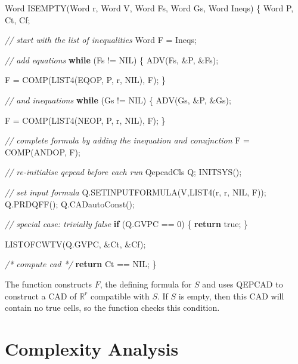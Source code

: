 \documentclass[
]{book}
\newenvironment{Shaded}{\begin{snugshade}}{\end{snugshade}}
\newcommand{\CommentTok}[1]{\textcolor[rgb]{0.56,0.35,0.01}{\textit{#1}}}
\newcommand{\ControlFlowTok}[1]{\textcolor[rgb]{0.13,0.29,0.53}{\textbf{#1}}}
\newcommand{\DecValTok}[1]{\textcolor[rgb]{0.00,0.00,0.81}{#1}}
\newcommand{\NormalTok}[1]{#1}
\theoremstyle{definition}
\theoremstyle{definition}
\theoremstyle{definition}
\theoremstyle{definition}
\theoremstyle{remark}
\begin{document}
\begin{Shaded}
\begin{Highlighting}[numbers=left,,]
\NormalTok{Word ISEMPTY(Word r, Word V, Word Fs, Word Gs, Word Ineqs)}
\NormalTok{\{}
\NormalTok{    Word P, Ct, Cf;}

    \CommentTok{// start with the list of inequalities}
\NormalTok{    Word F = Ineqs;}

    \CommentTok{// add equations}
    \ControlFlowTok{while}\NormalTok{ (Fs != NIL) \{}
\NormalTok{        ADV(Fs, \&P, \&Fs);}

\NormalTok{        F = COMP(LIST4(EQOP, P, r, NIL), F);}
\NormalTok{    \}}

    \CommentTok{// and inequations}
    \ControlFlowTok{while}\NormalTok{ (Gs != NIL) \{}
\NormalTok{        ADV(Gs, \&P, \&Gs);}

\NormalTok{        F = COMP(LIST4(NEOP, P, r, NIL), F);}
\NormalTok{    \}}

    \CommentTok{// complete formula by adding the inequation and conujnction}
\NormalTok{    F = COMP(ANDOP, F);}

    \CommentTok{// re{-}initialise qepcad before each run}
\NormalTok{    QepcadCls Q;}
\NormalTok{    INITSYS();}

    \CommentTok{// set input formula}
\NormalTok{    Q.SETINPUTFORMULA(V,LIST4(r, r, NIL, F));}
\NormalTok{    Q.PRDQFF();}
\NormalTok{    Q.CADautoConst();}

    \CommentTok{// special case: trivially false}
    \ControlFlowTok{if}\NormalTok{ (Q.GVPC == }\DecValTok{0}\NormalTok{) \{}
        \ControlFlowTok{return}\NormalTok{ true;}
\NormalTok{    \}}

\NormalTok{    LISTOFCWTV(Q.GVPC, \&Ct, \&Cf);}

    \CommentTok{/* compute cad */}
    \ControlFlowTok{return}\NormalTok{ Ct == NIL;}
\NormalTok{\}}
\end{Highlighting}
\end{Shaded}

The function constructs \(F\), the defining formula for \(S\) and uses QEPCAD to construct a CAD of \(\mathbb{R}^r\) compatible with \(S\). If \(S\) is empty, then this CAD will contain no true cells, so the function checks this condition.

\hypertarget{sec:strat-complexity}{%
\section{Complexity Analysis}\label{sec:strat-complexity}}
\end{document}

